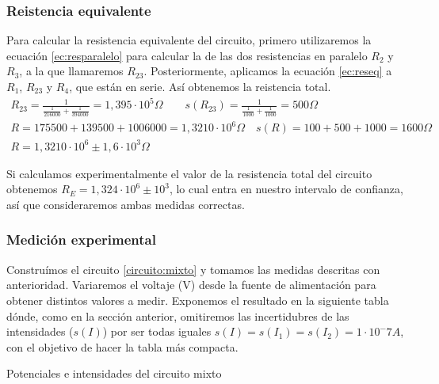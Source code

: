 \documentclass[12pt, a4paper, titlepage]{article}
\begin{document}
  \subsubsection{Reistencia equivalente}
  \label{sec:reseqmixto}

  Para calcular la resistencia equivalente del circuito, primero utilizaremos la ecuación \ref{ec:resparalelo} para calcular la de las dos resistencias en paralelo $R_2$ y $R_3$, a la que llamaremos $R_{23}$. Posteriormente, aplicamos la ecuación \ref{ec:reseq} a $R_1$, $R_{23}$ y $R_4$, que están en serie. Así obtenemos la reistencia total.
  \begin{gather}
    R_{23} = \frac{1}{\frac{1}{216000} + \frac{1}{394000}} = 1,395\cdot10^5\Omega \nonumber \qquad s(R_{23}) = \frac{1}{\frac{1}{1000} + \frac{1}{1000}} = 500\Omega \nonumber \\
    R = 175500 + 139500 + 1006000 = 1,3210\cdot10^6\Omega \nonumber \quad s(R) = 100 + 500 + 1000 = 1600\Omega \nonumber \\
    R = 1,3210\cdot10^6 \pm 1,6\cdot10^3\Omega
  \end{gather}

  Si calculamos experimentalmente el valor de la resistencia total del circuito obtenemos $R_E = 1,324 \cdot 10^6 \pm 10^3$, lo cual entra en nuestro intervalo de confianza, así que consideraremos ambas medidas correctas.

  \subsubsection{Medición experimental}

  Construímos el circuito \ref{circuito:mixto} y tomamos las medidas descritas con anterioridad. Variaremos el voltaje (V) desde la fuente de alimentación para obtener distintos valores a medir. Exponemos el resultado en la siguiente tabla dónde, como en la sección anterior, omitiremos las incertidubres de las intensidades ($s(I)$) por ser todas iguales $s(I) = s(I_1) = s(I_2) = 1 \cdot 10^-7 A$, con el objetivo de hacer la tabla más compacta.

  \begin{table}[H]
  \centering
  \caption{Potenciales e intensidades del circuito mixto}
  \end{table}
\end{document}

